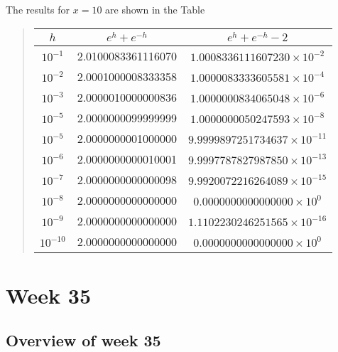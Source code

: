 \documentclass[%
twoside,                 %
final,                   %
10pt]{article}
\newenvironment{block_mdfboxadmon}[1][]{
\begin{block_mdfboxmdframed}[frametitle=#1]
}
{
\end{block_mdfboxmdframed}
}
\begin{document}
\begin{block_mdfboxadmon}[]
The results for $x=10$ are shown in the Table


\begin{quote}
\begin{tabular}{ccc}
\hline
\multicolumn{1}{c}{ $h$ } & \multicolumn{1}{c}{ $e^{h}+e^{-h}$ } & \multicolumn{1}{c}{ $e^{h}+e^{-h}-2$ } \\
\hline
$10^{-1}$                           & 2.0100083361116070                  & $1.0008336111607230\times 10^{-2}$  \\
$10^{-2}$                           & 2.0001000008333358                  & $1.0000083333605581\times 10^{-4}$  \\
$10^{-3}$                           & 2.0000010000000836                  & $1.0000000834065048\times 10^{-6}$  \\
$10^{-5}$                           & 2.0000000099999999                  & $1.0000000050247593\times 10^{-8}$  \\
$10^{-5}$                           & 2.0000000001000000                  & $9.9999897251734637\times 10^{-11}$ \\
$10^{-6}$                           & 2.0000000000010001                  & $9.9997787827987850\times 10^{-13}$ \\
$10^{-7}$                           & 2.0000000000000098                  & $9.9920072216264089\times 10^{-15}$ \\
$10^{-8}$                           & 2.0000000000000000                  & $0.0000000000000000\times 10^{0}$   \\
$10^{-9}$                           & 2.0000000000000000                  & $1.1102230246251565\times 10^{-16}$ \\
$10^{-10}$                          & 2.0000000000000000                  & $0.0000000000000000\times 10^{0}$   \\
\hline
\end{tabular}
\end{quote}

\noindent
\end{block_mdfboxadmon}




\section{Week 35}

\subsection{Overview of week 35}
\end{document}
